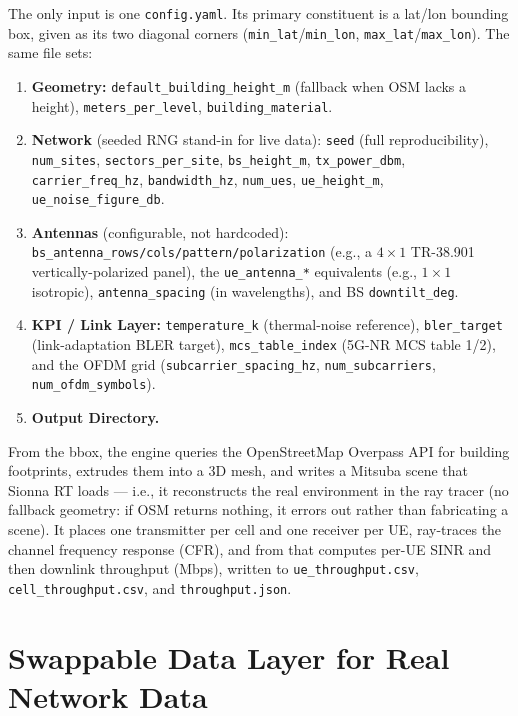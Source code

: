 \documentclass[11pt]{article}
\begin{document}
The only input is one \texttt{config.yaml}. Its primary constituent is a lat/lon
bounding box, given as its two diagonal corners (\texttt{min_lat}/\texttt{min_lon},
\texttt{max_lat}/\texttt{max_lon}). The same file sets:

\begin{enumerate}[leftmargin=*]
  \item \textbf{Geometry:} \texttt{default_building_height_m} (fallback when OSM
  lacks a height), \texttt{meters_per_level}, \texttt{building_material}.
  \item \textbf{Network} (seeded RNG stand-in for live data): \texttt{seed} (full
  reproducibility), \texttt{num_sites}, \texttt{sectors_per_site},
  \texttt{bs_height_m}, \texttt{tx_power_dbm}, \texttt{carrier_freq_hz},
  \texttt{bandwidth_hz}, \texttt{num_ues}, \texttt{ue_height_m},
  \texttt{ue_noise_figure_db}.
  \item \textbf{Antennas} (configurable, not hardcoded):
  \texttt{bs_antenna_rows/cols/pattern/polarization} (e.g., a $4\times1$ TR-38.901
  vertically-polarized panel), the \texttt{ue_antenna_*} equivalents (e.g.,
  $1\times1$ isotropic), \texttt{antenna_spacing} (in wavelengths), and BS
  \texttt{downtilt_deg}.
  \item \textbf{KPI / Link Layer:} \texttt{temperature_k} (thermal-noise
  reference), \texttt{bler_target} (link-adaptation BLER target),
  \texttt{mcs_table_index} (5G-NR MCS table 1/2), and the OFDM grid
  (\texttt{subcarrier_spacing_hz}, \texttt{num_subcarriers},
  \texttt{num_ofdm_symbols}).
  \item \textbf{Output Directory.}
\end{enumerate}

From the bbox, the engine queries the OpenStreetMap Overpass API for building
footprints, extrudes them into a 3D mesh, and writes a Mitsuba scene that Sionna
RT loads --- i.e., it reconstructs the real environment in the ray tracer (no
fallback geometry: if OSM returns nothing, it errors out rather than fabricating a
scene). It places one transmitter per cell and one receiver per UE, ray-traces the
channel frequency response (CFR), and from that computes per-UE SINR and then
downlink throughput (Mbps), written to \texttt{ue_throughput.csv},
\texttt{cell_throughput.csv}, and \texttt{throughput.json}.

\section{Swappable Data Layer for Real Network Data}
\end{document}
